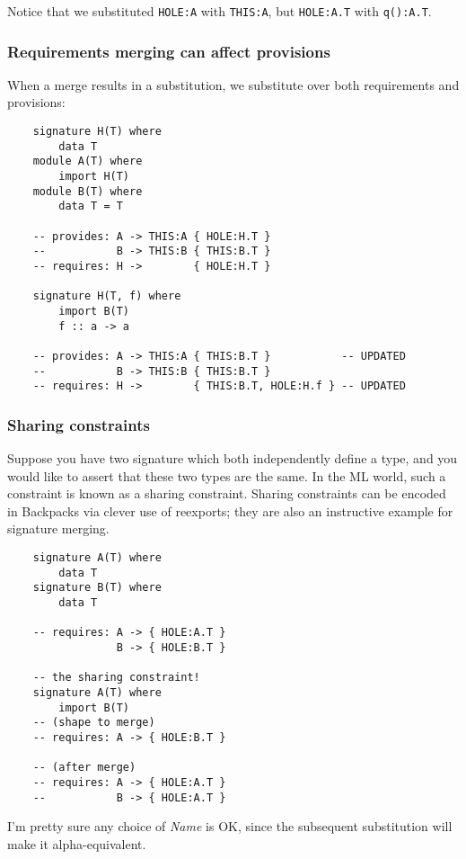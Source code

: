 \documentclass{article}
\newcommand{\Red}[1]{{\color{red} #1}}
\begin{document}
Notice that we substituted \verb|HOLE:A| with \verb|THIS:A|, but \verb|HOLE:A.T| with \verb|q():A.T|.

\subsubsection{Requirements merging can affect provisions}

When a merge results in a substitution, we substitute over both
requirements and provisions:

\begin{verbatim}
    signature H(T) where
        data T
    module A(T) where
        import H(T)
    module B(T) where
        data T = T

    -- provides: A -> THIS:A { HOLE:H.T }
    --           B -> THIS:B { THIS:B.T }
    -- requires: H ->        { HOLE:H.T }

    signature H(T, f) where
        import B(T)
        f :: a -> a

    -- provides: A -> THIS:A { THIS:B.T }           -- UPDATED
    --           B -> THIS:B { THIS:B.T }
    -- requires: H ->        { THIS:B.T, HOLE:H.f } -- UPDATED
\end{verbatim}

\subsubsection{Sharing constraints}

Suppose you have two signature which both independently define a type,
and you would like to assert that these two types are the same.  In the
ML world, such a constraint is known as a sharing constraint.  Sharing
constraints can be encoded in Backpacks via clever use of reexports;
they are also an instructive example for signature merging.

\begin{verbatim}
    signature A(T) where
        data T
    signature B(T) where
        data T

    -- requires: A -> { HOLE:A.T }
                 B -> { HOLE:B.T }

    -- the sharing constraint!
    signature A(T) where
        import B(T)
    -- (shape to merge)
    -- requires: A -> { HOLE:B.T }

    -- (after merge)
    -- requires: A -> { HOLE:A.T }
    --           B -> { HOLE:A.T }
\end{verbatim}
%
\Red{I'm pretty sure any choice of \textit{Name} is OK, since the
subsequent substitution will make it alpha-equivalent.}
\end{document}
